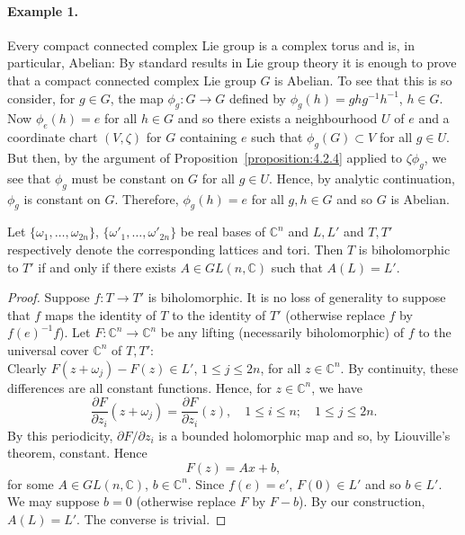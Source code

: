 \paragraph*{Example 1.} Every compact connected complex Lie group is a complex torus and is, in particular, Abelian: By standard results in Lie group theory it is enough to prove that a compact connected complex Lie group $G$ is Abelian. To see that this is so consider, for $g\in G$, the map $\phi_g:G\longrightarrow G$ defined by $\phi_g(h)=ghg^{-1}h^{-1}$, $h\in G$. Now $\phi_e(h)=e$ for all $h\in G$ and so there exists a neighbourhood $U$ of $e$ and a coordinate chart $(V,\zeta)$ for $G$ containing $e$ such that $\phi_g(G)\subset V$ for all $g\in U$. But then, by the argument of Proposition~\ref{proposition:4.2.4} applied to $\zeta\phi_g$, we see that
$\phi_g$ must be constant on $G$ for all $g\in U$. Hence, by analytic continuation, $\phi_g$ is constant on $G$. Therefore, $\phi_g(h)=e$ for all $g,h\in G$ and so $G$ is Abelian.

 Let $\{\omega_1,\ldots,\omega_{2n}\}$, $\{\omega'_1,\ldots,\omega'_{2n}\}$ be real bases of $\mathbb C^n$ and $L,L'$ and $T,T'$ respectively denote the corresponding lattices and tori. Then $T$ is biholomorphic to $T'$ if and only if there exists $A\in GL(n,\mathbb C)$ such that $A(L)=L'$.
\begin{proof}
Suppose $f:T\longrightarrow T'$ is biholomorphic. It is no loss of generality to suppose that $f$ maps the identity of $T$ to the identity of $T'$ (otherwise replace $f$ by $f(e)^{-1}f$). Let $F:\mathbb C^n\longrightarrow\mathbb C^n$ be any lifting (necessarily biholomorphic) of $f$ to the universal cover $\mathbb C^n$ of $T,T'$:
\[

\]
Clearly $F(z+\omega_j)-F(z)\in L'$, $1\leq j\leq2n$, for all $z\in\mathbb C^n$. By continuity, these differences are all constant functions. Hence, for $z\in\mathbb C^n$, we have
\[
\frac{\partial F}{\partial z_i}(z+\omega_j)=\frac{\partial F}{\partial z_i}(z),\quad1\leq i\leq n;\quad1\leq j\leq2n.
\]
By this periodicity, $\partial F/\partial z_i$ is a bounded holomorphic map and so, by Liouville's theorem, constant. Hence
\[
F(z)=Ax+b,
\]
for some $A\in GL(n,\mathbb C)$, $b\in\mathbb C^n$. Since $f(e)=e'$, $F(0)\in L'$ and so $b\in L'$. We may suppose $b=0$ (otherwise replace $F$ by $F-b$). By our construction, $A(L)=L'$. The converse is trivial.
\end{proof}

